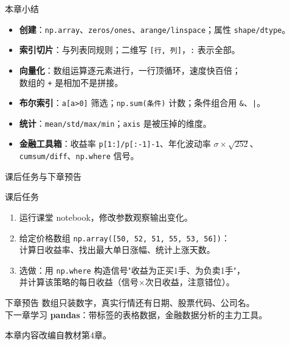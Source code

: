 \documentclass[9pt]{ctexbeamer}
\begin{document}
\begin{frame}{本章小结}
	\begin{itemize}
		\item \textbf{创建}：\texttt{np.array}、\texttt{zeros/ones}、\texttt{arange/linspace}；属性 \texttt{shape/dtype}。
		\item \textbf{索引切片}：与列表同规则；二维写 \texttt{[行, 列]}，\texttt{:} 表示全部。
		\item \textbf{向量化}：数组运算逐元素进行，一行顶循环，速度快百倍；\\
		\alert{数组的 \texttt{+} 是相加不是拼接}。
		\item \textbf{布尔索引}：\texttt{a[a>0]} 筛选；\texttt{np.sum(条件)} 计数；条件组合用 \texttt{\&}、\texttt{|}。
		\item \textbf{统计}：\texttt{mean/std/max/min}；\texttt{axis} 是被压掉的维度。
		\item \textbf{金融工具箱}：收益率 \texttt{p[1:]/p[:-1]-1}、年化波动率 $\sigma\times\sqrt{252}$、\texttt{cumsum/diff}、\texttt{np.where} 信号。
	\end{itemize}
\end{frame}

\begin{frame}{课后任务与下章预告}
	\begin{block}{课后任务}
		\begin{enumerate}
			\item 运行课堂 notebook，修改参数观察输出变化。
			\item 给定价格数组 \texttt{np.array([50, 52, 51, 55, 53, 56])}：\\
			计算日收益率、找出最大单日涨幅、统计上涨天数。
			\item 选做：用 \texttt{np.where} 构造信号"收益为正买1手、为负卖1手"，\\
			并计算该策略的每日收益（信号$\times$次日收益，注意错位）。
		\end{enumerate}
	\end{block}
	\begin{exampleblock}{下章预告}
		数组只装数字，真实行情还有日期、股票代码、公司名。\\
		下一章学习 \textbf{pandas}：带标签的表格数据，金融数据分析的主力工具。
	\end{exampleblock}
	\begin{center}
		\vspace{0.5em}
		本章内容改编自教材第4章\citep{hilpisch2018python}。
	\end{center}
\end{frame}
\end{document}

